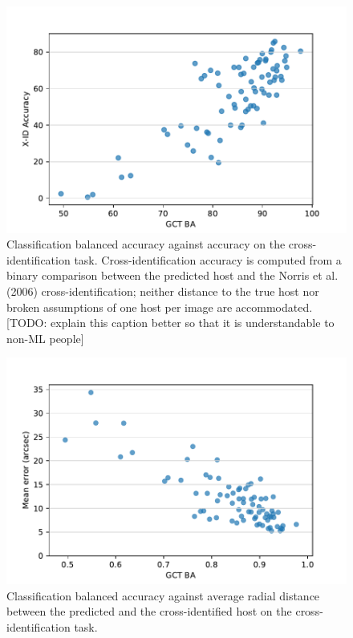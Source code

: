 \documentclass[fleqn,usenatbib,usedcolumn]{mnras}
\begin{document}
  \begin{figure}
  \centering
  \includegraphics[width=\columnwidth]{gct-to-xid.pdf}
  \caption{Classification balanced accuracy against accuracy on the
  cross-identification task. Cross-identification accuracy is computed
  from a binary comparison between the predicted host and the Norris et
  al. (2006) cross-identification; neither distance to the true host nor
  broken assumptions of one host per image are accommodated. {[}TODO:
  explain this caption better so that it is understandable to non-ML
  people{]}\label{fig:gct-to-xid}}
  \end{figure}

  \begin{figure}
  \centering
  \includegraphics[width=\columnwidth]{gct-to-arcsec-error.pdf}
  \caption{Classification balanced accuracy against average radial
  distance between the predicted and the \citet{norris06} cross-identified
  host on the cross-identification task.\label{fig:gct-to-arcsec-error}}
  \end{figure}
\end{document}
